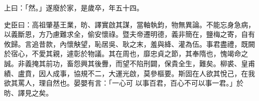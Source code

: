 \begin{pinyinscope}
 上曰：「然。」遂廢於家，是歲卒，年五十四。



 史臣曰：高祖肇基王業，昉、譯實啟其謀，當軸執鈞，物無異論。不能忘身急病，以義斷恩，方乃慮難求全，偷安懷祿。暨夫帝遷明德，義非簡在，鹽梅之寄，自有攸歸。言追昔款，內懷觖望，恥居吳、耿之末，羞與絳、灌為伍。事君盡禮，既闕於宿心，不愛其親，遽彰於物議。其在周也，靡忠貞之節，其奉隋也，愧竭命之誠。非義掩其前功，畜怨興其後釁，而望不陷刑闢，保貴全生，難矣。柳裘、皇甫績、盧賁，因人成事，協規不二，大運光啟，莫參樞要。斯固在人欲其悅己，在我欲其罵人，理自然也。晏嬰有言：「一心可
 以事百君，百心不可以事一君。」於昉、譯見之矣。



\end{pinyinscope}